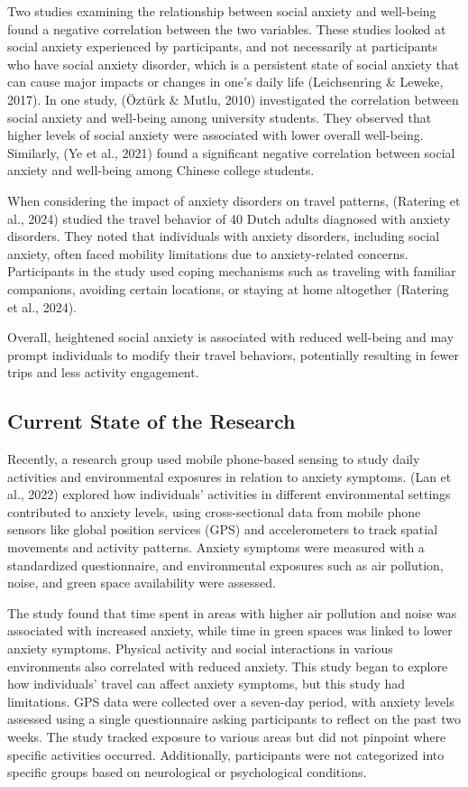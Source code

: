 \documentclass[
  letterpaper,
  number,
  review,
  3p]{elsarticle}
\begin{document}
Two studies examining the relationship between social anxiety and
well-being found a negative correlation between the two variables. These
studies looked at social anxiety experienced by participants, and not
necessarily at participants who have social anxiety disorder, which is a
persistent state of social anxiety that can cause major impacts or
changes in one's daily life (Leichsenring \& Leweke, 2017). In one
study, (Öztürk \& Mutlu, 2010) investigated the correlation between
social anxiety and well-being among university students. They observed
that higher levels of social anxiety were associated with lower overall
well-being. Similarly, (Ye et al., 2021) found a significant negative
correlation between social anxiety and well-being among Chinese college
students.

When considering the impact of anxiety disorders on travel patterns,
(Ratering et al., 2024) studied the travel behavior of 40 Dutch adults
diagnosed with anxiety disorders. They noted that individuals with
anxiety disorders, including social anxiety, often faced mobility
limitations due to anxiety-related concerns. Participants in the study
used coping mechanisms such as traveling with familiar companions,
avoiding certain locations, or staying at home altogether (Ratering et
al., 2024).

Overall, heightened social anxiety is associated with reduced well-being
and may prompt individuals to modify their travel behaviors, potentially
resulting in fewer trips and less activity engagement.

\subsection{Current State of the
Research}\label{current-state-of-the-research}

Recently, a research group used mobile phone-based sensing to study
daily activities and environmental exposures in relation to anxiety
symptoms. (Lan et al., 2022) explored how individuals' activities in
different environmental settings contributed to anxiety levels, using
cross-sectional data from mobile phone sensors like global position
services (GPS) and accelerometers to track spatial movements and
activity patterns. Anxiety symptoms were measured with a standardized
questionnaire, and environmental exposures such as air pollution, noise,
and green space availability were assessed.

The study found that time spent in areas with higher air pollution and
noise was associated with increased anxiety, while time in green spaces
was linked to lower anxiety symptoms. Physical activity and social
interactions in various environments also correlated with reduced
anxiety. This study began to explore how individuals' travel can affect
anxiety symptoms, but this study had limitations. GPS data were
collected over a seven-day period, with anxiety levels assessed using a
single questionnaire asking participants to reflect on the past two
weeks. The study tracked exposure to various areas but did not pinpoint
where specific activities occurred. Additionally, participants were not
categorized into specific groups based on neurological or psychological
conditions.
\end{document}
